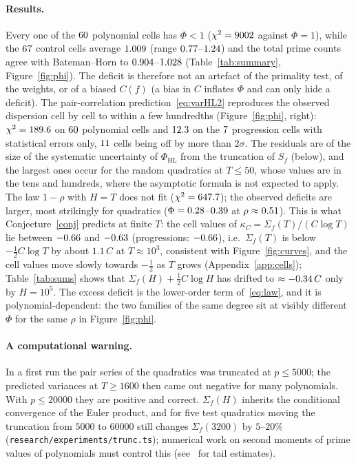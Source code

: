 \documentclass[11pt,a4paper]{article}
\theoremstyle{remark}\newtheorem{remark}[theorem]{Remark}
\begin{document}
\paragraph{Results.} Every one of the $60$ polynomial cells has $\Phi<1$
($\chi^2=9002$ against $\Phi=1$), while the $67$ control cells average $1.009$ (range
$0.77$--$1.24$) and the total prime counts agree with Bateman--Horn to
$0.904$--$1.028$ (Table~\ref{tab:summary}, Figure~\ref{fig:phi}). The deficit is therefore
not an artefact of the primality test, of the weights, or of a biased $C(f)$ (a bias in $C$ inflates
$\Phi$ and can only hide a deficit). The pair-correlation prediction~\eqref{eq:varHL2} reproduces the
observed dispersion cell by cell to within a few hundredths (Figure~\ref{fig:phi}, right):
$\chi^2=189.6$ on $60$ polynomial cells and $12.3$ on the $7$ progression cells with
statistical errors only, $11$ cells being off by more than $2\sigma$. The residuals are of the size
of the systematic uncertainty of $\Phi_{\mathrm{HL}}$ from the truncation of $S_f$ (below), and the
largest ones occur for the random quadratics at $T\le50$, whose values are in the tens and hundreds,
where the asymptotic formula is not expected to apply. The law $1-\rho$ with
$H=T$ does not fit ($\chi^2=647.7$); the observed deficits are larger, most strikingly for quadratics
($\Phi=0.28$--$0.39$ at $\rho\approx0.51$). This is what Conjecture~\ref{conj} predicts
at finite $T$: the cell values of $\kappa_C=\Sigma_f(T)/(C\log T)$ lie between $-0.66$ and
$-0.63$ (progressions: $-0.66$), i.e.\ $\Sigma_f(T)$ is below $-\tfrac12C\log T$ by
about $1.1\,C$ at $T\approx10^3$, consistent with Figure~\ref{fig:curves}, and the cell values move
slowly towards $-\tfrac12$ as $T$ grows (Appendix~\ref{app:cells}); Table~\ref{tab:sums} shows that
$\Sigma_f(H)+\tfrac12C\log H$ has drifted to $\approx-0.34\,C$ only by $H=10^5$. The excess
deficit is the lower-order term of~\eqref{eq:law}, and it is polynomial-dependent: the two families of
the same degree sit at visibly different $\Phi$ for the same $\rho$ in Figure~\ref{fig:phi}.

\paragraph{A computational warning.} In a first run the pair series of the quadratics was truncated at
$p\le5000$; the predicted variances at $T\ge1600$ then came out negative for many polynomials. With
$p\le20000$ they are positive and correct. $\Sigma_f(H)$ inherits the conditional convergence of the
Euler product, and for five test quadratics moving the truncation from $5000$ to $60000$ still changes
$\Sigma_f(3200)$ by $5$--$20\%$ (\texttt{research/experiments/trunc.ts}); numerical work on second moments of prime
values of polynomials must control this (see~\cite{Volfson2026} for tail estimates).
\end{document}
